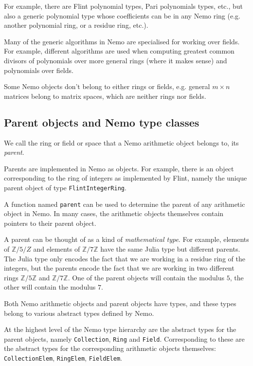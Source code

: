 \documentclass[a4paper,10pt]{article}
\newcommand{\Z}{\mathbb{Z}}
\newcommand{\code}{\lstinline}
\begin{document}
For example, there are Flint polynomial types, Pari polynomials types, etc., but also a generic
polynomial type whose coefficients can be in any Nemo ring (e.g. another polynomial ring, or a residue
ring, etc.).

Many of the generic algorithms in Nemo are specialised for working over fields. For example, different
algorithms are used when computing greatest common divisors of polynomials over more general rings 
(where it makes sense) and polynomials over fields.
 
Some Nemo objects don't belong to either rings or fields, e.g. general $m\times n$ matrices belong to
matrix spaces, which are neither rings nor fields.

\subsection{Parent objects and Nemo type classes}

We call the ring or field or space that a Nemo arithmetic object belongs to, its \emph{parent}.

Parents are implemented in Nemo as objects. For example, there is an object corresponding to the ring
of integers as implemented by Flint, namely the unique parent object of type \code{FlintIntegerRing}.

A function named \code{parent} can be used to determine the parent of any arithmetic object in Nemo. In
many cases, the arithmetic objects themselves contain pointers to their parent object.

A parent can be thought of as a kind of \emph{mathematical type}. For example, elements of $\Z/5/Z$ and
elements of $\Z/7\Z$ have the same Julia type but different parents. The Julia type only encodes the
fact that we are working in a residue ring of the integers, but the parents encode the fact that we are
working in two different rings $\Z/5\Z$ and $\Z/7\Z$. One of the parent objects will contain the modulus
$5$, the other will contain the modulus $7$.

Both Nemo arithmetic objects and parent objects have types, and these types belong to various abstract
types defined by Nemo.

At the highest level of the Nemo type hierarchy are the abstract types for the parent objects, namely
\code{Collection}, \code{Ring} and \code{Field}. Corresponding to these are the abstract types for the
corresponding arithmetic objects themselves: \code{CollectionElem}, \code{RingElem}, \code{FieldElem}.
\end{document}
